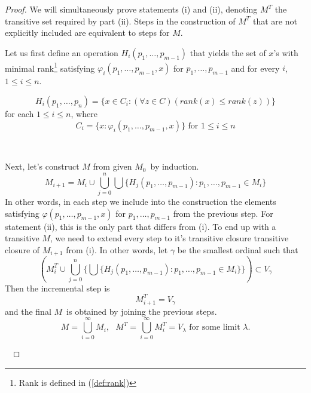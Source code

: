 \begin{proof}
We will simultaneously prove statements (i) and (ii), denoting $M^T$ the transitive set required by part (ii).
Steps in the construction of $M^T$ that are not explicitly included are equivalent to steps for $M$.

Let us first define an operation $H_i(p_1, \ldots, p_{m-1})$ that yields the set of $x$'s with minimal rank\footnote{Rank is defined in (\ref{def:rank})} satisfying $\varphi_i(p_1, \ldots, p_{m-1}, x)$ for $p_1, \ldots, p_{m-1}$ and for every $i$, $1 \leq i \leq n$.

\begin{equation}
H_i(p_1, \ldots, p_n) = \{x \in C_i: (\forall z \in C)(rank(x) \leq rank(z))\}
\end{equation}
for each $1 \leq i \leq n$, where
\begin{equation}
C_i = \{x: \varphi_i(p_1, \ldots, p_{m-1}, x)\} \mbox{ for $1 \leq i \leq n$}
\end{equation}

\

Next, let's construct $M$ from given $M_0$ by induction. 
\begin{equation}
M_{i+1} = M_i \cup \bigcup_{j=0}^{n} \bigcup \{H_j(p_1, \ldots, p_{m-1}): p_1, \ldots, p_{m-1} \in M_i\}
\end{equation}
In other words, in each step we include into the construction the elements satisfying $\varphi(p_1, \ldots, p_{m-1}, x)$ for $p_1, \ldots, p_{m-1}$ from the previous step.
For statement (ii), this is the only part that differs from (i). To end up with a transitive $M$, we need to extend every step to it's transitive closure transitive closure of $M_{i+1}$ from (i). In other words, let $\gamma$ be the smallest ordinal such that 
\begin{equation}
(M^T_i \cup \bigcup_{j=0}^{n} \{\bigcup\{H_j(p_1, \ldots, p_{m-1}): p_1, \ldots, p_{m-1} \in M_i\}\}) \subset V_\gamma
\end{equation}
Then the incremental step is
\begin{equation}
M^T_{i+1} = V_\gamma
\end{equation}
and the final $M$ is obtained by joining the previous steps.
\begin{equation}
M = \bigcup_{i=0}^{\infty} M_i, \mbox{  }M^T = \bigcup_{i=0}^{\infty} M^T_i = V_\lambda\mbox{ for some limit }\lambda\mbox{.}
\end{equation}

\


\end{proof}
